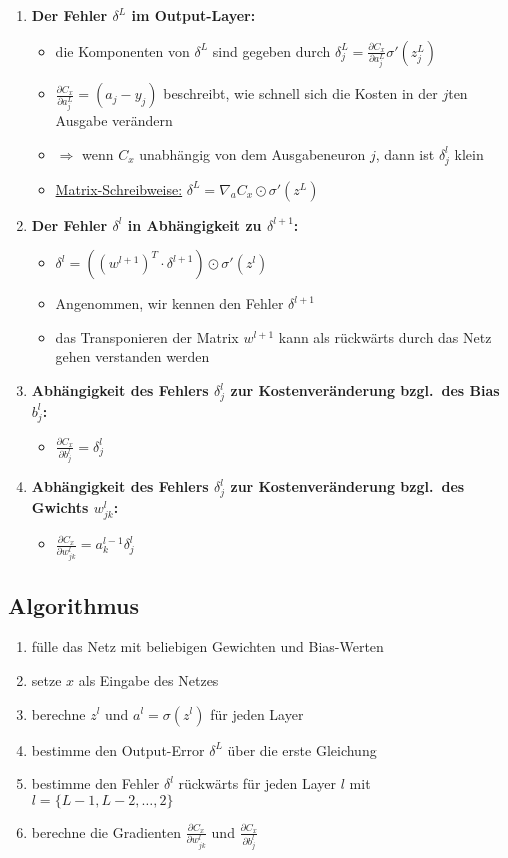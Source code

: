 \begin{enumerate}
  \item \textbf{Der Fehler $\delta^L$ im Output-Layer:}
  \begin{itemize}
    \item die Komponenten von $\delta^L$ sind gegeben durch $\delta^L_j = \frac{\partial C_x}{\partial a_j^L}\sigma'(z^L_j)$
    \item $\frac{\partial C_x}{\partial a_j^L} = (a_j - y_j)$ beschreibt, wie schnell sich die Kosten in der $j$ten Ausgabe verändern
    \item $\Rightarrow$ wenn $C_x$ unabhängig von dem Ausgabeneuron $j$, dann ist $\delta_j^l$ klein
    \item \underline{Matrix-Schreibweise:} $\delta^L = \nabla_a C_x \odot \sigma'(z^L)$
  \end{itemize}
  \item \textbf{Der Fehler $\delta^l$ in Abhängigkeit zu $\delta^{l+1}$:}
  \begin{itemize}
    \item $\delta^l = ({(w^{l+1})}^T \cdot \delta^{l+1}) \odot \sigma'(z^l)$
    \item Angenommen, wir kennen den Fehler $\delta^{l+1}$
    \item das Transponieren der Matrix $w^{l+1}$ kann als rückwärts durch das Netz gehen verstanden werden
  \end{itemize}
  \item \textbf{Abhängigkeit des Fehlers $\delta^l_j$ zur Kostenveränderung bzgl.\ des Bias $b^l_j$:}
  \begin{itemize}
    \item $\frac{\partial C_x}{\partial b^l_j} = \delta^l_j$
  \end{itemize}
  \item \textbf{Abhängigkeit des Fehlers $\delta^l_j$ zur Kostenveränderung bzgl.\ des Gwichts $w^l_{jk}$:}
  \begin{itemize}
    \item $\frac{\partial C_x}{\partial w^l_{jk}} = a_k^{l-1} \delta_j^l$
  \end{itemize}
\end{enumerate}

\subsection{Algorithmus}

\begin{enumerate}
  \item fülle das Netz mit beliebigen Gewichten und Bias-Werten
  \item setze $x$ als Eingabe des Netzes
  \item berechne $z^l$ und $a^l = \sigma(z^l)$ für jeden Layer
  \item bestimme den Output-Error $\delta^L$ über die erste Gleichung
  \item bestimme den Fehler $\delta^l$ rückwärts für jeden Layer $l$ mit $l = \lbrace L-1, L-2, \ldots, 2 \rbrace$
  \item berechne die Gradienten $\frac{\partial C_x}{\partial w^l_{jk}}$ und $\frac{\partial C_x}{\partial b^l_j}$
\end{enumerate}

